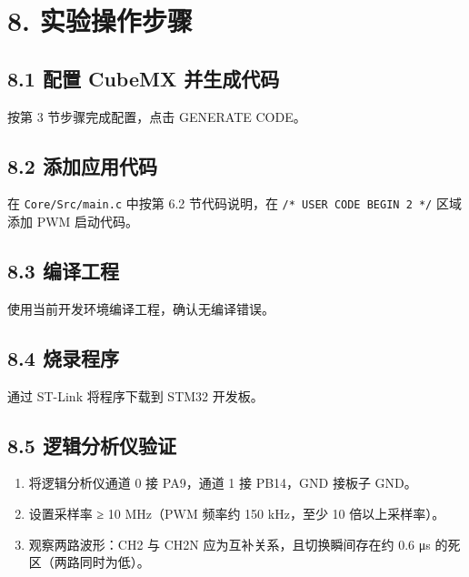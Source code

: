\documentclass[
  chinese,
  UTF8,
  oneside,
  openany]{ctexbook}
\providecommand{\tightlist}{%
  \setlength{\itemsep}{0pt}\setlength{\parskip}{0pt}}
\begin{document}
\section{8. 实验操作步骤}\label{ux5b9eux9a8cux64cdux4f5cux6b65ux9aa4-5}

\subsection{8.1 配置 CubeMX
并生成代码}\label{ux914dux7f6e-cubemx-ux5e76ux751fux6210ux4ee3ux7801-2}

按第 3 节步骤完成配置，点击 GENERATE CODE。

\subsection{8.2
添加应用代码}\label{ux6dfbux52a0ux5e94ux7528ux4ee3ux7801-2}

在 \texttt{Core/Src/main.c} 中按第 6.2 节代码说明，在
\texttt{/*\ USER\ CODE\ BEGIN\ 2\ */} 区域添加 PWM 启动代码。

\subsection{8.3 编译工程}\label{ux7f16ux8bd1ux5de5ux7a0b-5}

使用当前开发环境编译工程，确认无编译错误。

\subsection{8.4 烧录程序}\label{ux70e7ux5f55ux7a0bux5e8f-5}

通过 ST-Link 将程序下载到 STM32 开发板。

\subsection{8.5
逻辑分析仪验证}\label{ux903bux8f91ux5206ux6790ux4eeaux9a8cux8bc1}

\begin{enumerate}
\def\labelenumi{\arabic{enumi}.}
\tightlist
\item
  将逻辑分析仪通道 0 接 PA9，通道 1 接 PB14，GND 接板子 GND。
\item
  设置采样率 ≥ 10 MHz（PWM 频率约 150 kHz，至少 10 倍以上采样率）。
\item
  观察两路波形：CH2 与 CH2N 应为互补关系，且切换瞬间存在约 0.6 μs
  的死区（两路同时为低）。
\end{enumerate}
\end{document}
